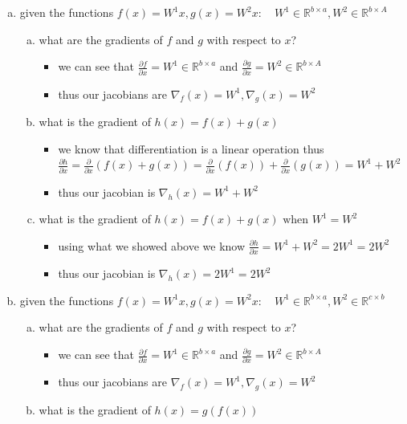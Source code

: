 \documentclass{article}
\begin{document}
\begin{enumerate}[(a)]
\begin{itemize}
    \end{itemize}
    \item given the functions $f(x)=W^{1}x, g(x)=W^{2}x:\quad W^1\in \mathbb{R}^{b\times a}, W^{2}\in \mathbb{R}^{b\times A}$
    \begin{enumerate}[(a)]
        \item what are the gradients of $f$ and $g$ with respect to $x$?
        \begin{itemize}
           \color{blue}
            \item we can see that $\frac{\partial f}{\partial x}=W^{1}\in \mathbb{R}^{b\times a}$ and $\frac{\partial g}{\partial x}=W^{2}\in \mathbb{R}^{b\times A}$
            \item thus our jacobians are $\nabla_f(x)=W^1, \nabla_g(x)=W^2$
        \end{itemize}
    \item what is the gradient of $h(x)=f(x)+g(x)$

    \begin{itemize}
        \color{blue}
        \item we know that differentiation is a linear operation thus $\frac{\partial h}{\partial x}=\frac{\partial}{\partial x}(f(x)+g(x))=\frac{\partial}{\partial x}(f(x))+\frac{\partial}{\partial x}(g(x))=W^{1}+W^{2}$
        \item thus our jacobian is $\nabla_h(x)=W^1+W^2$
    \end{itemize}
    \item what is the gradient of $h(x)=f(x)+g(x) \text{ when } W^1=W^2$

    \begin{itemize}
    \color{blue}
    \item using what we showed above we know $\frac{\partial h}{\partial x} = W^1+W^2=2W^1=2W^2 $
    \item thus our jacobian is $\nabla_h(x)=2W^1=2W^2$
\end{itemize}   
\end{enumerate}
\item given the functions $f(x)=W^{1}x, g(x)=W^{2}x:\quad W^1\in \mathbb{R}^{b\times a}, W^{2}\in \mathbb{R}^{c\times b}$
\begin{enumerate}[(a)]
    \item what are the gradients of $f$ and $g$ with respect to $x$?
    \begin{itemize}
       \color{blue}
        \item we can see that $\frac{\partial f}{\partial x}=W^{1}\in \mathbb{R}^{b\times a}$ and $\frac{\partial g}{\partial x}=W^{2}\in \mathbb{R}^{b\times A}$
        \item thus our jacobians are $\nabla_f(x)=W^1, \nabla_g(x)=W^2$
    \end{itemize}
\item what is the gradient of $h(x)=g(f(x))$


\end{enumerate}
\end{enumerate}
\end{document}
